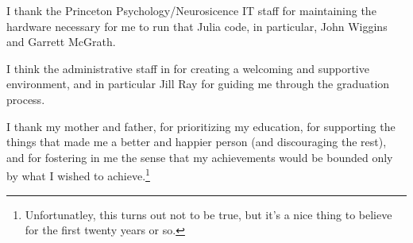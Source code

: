 I thank the Princeton Psychology/Neurosicence IT staff for maintaining the hardware necessary for me to run that Julia code, in particular, John Wiggins and Garrett McGrath.

I think the administrative staff in for creating a welcoming and supportive environment, and in particular Jill Ray for guiding me through the graduation process.

I thank my mother and father, for prioritizing my education, for supporting the things that made me a better and happier person (and discouraging the rest),  and for fostering in me the sense that my achievements would be bounded only by what I wished to achieve.\footnote{%
  Unfortunatley, this turns out not to be true, but it's a nice thing to believe for the first twenty years or so.
}












